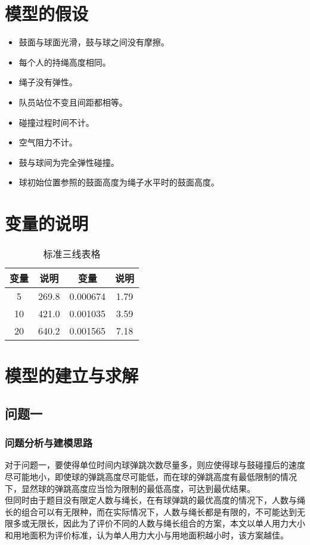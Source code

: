 \documentclass[withoutpreface,bwprint]{cumcmthesis} %
\begin{document}
\section{模型的假设}

\begin{itemize}
    \item 鼓面与球面光滑，鼓与球之间没有摩擦。
    \item 每个人的持绳高度相同。
    \item 绳子没有弹性。
	\item 队员站位不变且间距都相等。
	\item 碰撞过程时间不计。
	\item 空气阻力不计。
	\item 鼓与球间为完全弹性碰撞。
	\item 球初始位置参照的鼓面高度为绳子水平时的鼓面高度。
\end{itemize}



\section{变量的说明}

\begin{table}[!htbp]
    \caption{标准三线表格}\label{tab:001} \centering
    \begin{tabular}{cccc}
        \toprule[1.5pt]
        变量 & 说明 & 变量 &  说明 \\
        \midrule[1pt]
        5 & 269.8 & 0.000674 & 1.79  \\
        10 & 421.0 & 0.001035 & 3.59 \\
        20 & 640.2 & 0.001565 & 7.18 \\
        \bottomrule[1.5pt]
    \end{tabular}
\end{table}




\section{模型的建立与求解}

\subsection{问题一}
	\subsubsection{问题分析与建模思路}
对于问题一，要使得单位时间内球弹跳次数尽量多，则应使得球与鼓碰撞后的速度尽可能地小，即使球的弹跳高度尽可能低，而在球的弹跳高度有最低限制的情况下，显然球的弹跳高度应当恰为限制的最低高度，可达到最优结果。
\\
但同时由于题目没有限定人数与绳长，在有球弹跳的最优高度的情况下，人数与绳长的组合可以有无限种，而在实际情况下，人数与绳长都是有限的，不可能达到无限多或无限长，因此为了评价不同的人数与绳长组合的方案，本文以单人用力大小和用地面积为评价标准，认为单人用力大小与用地面积越小时，该方案越佳。
\end{document}
